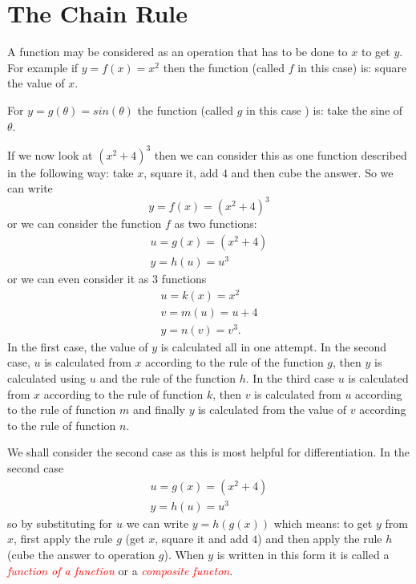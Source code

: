 \documentclass[
  11pt,
  oneside]{book}
\newcommand{\slide}{}
\theoremstyle{definition}
\theoremstyle{definition}
\theoremstyle{definition}
\theoremstyle{definition}
\theoremstyle{remark}
\begin{document}
\slide

\section{The Chain Rule}\label{lecture-five}

A function may be considered as an operation that has to be done to \(x\) to get \(y\). For example if \(y = f(x) = x^2\) then the function (called \(f\) in this case) is: square the value of \(x\).

For \(y = g(\theta) = sin(\theta)\) the function (called \(g\) in this case ) is: take the sine of \(\theta\).

If we now look at \((x^2 + 4)^3\) then we can consider this as one function described in the following way: take \(x\), square it, add \(4\) and then cube the answer. So we can write
\[
y = f(x) = (x^2+ 4)^3
\]
or we can consider the function \(f\) as two functions:
\begin{gather*}
u = g(x) = (x^2 + 4)\\
y = h(u) = u^3
\end{gather*}
or we can even consider it as 3 functions
\begin{gather*}
u = k(x) = x^2\\
v = m(u) = u + 4\\
y = n(v) = v^3.
\end{gather*}
In the first case, the value of \(y\) is calculated all in one attempt. In the second case, \(u\) is calculated from \(x\) according to the rule of the function \(g\), then \(y\) is calculated using \(u\) and the rule of the function \(h\). In the third case \(u\) is calculated from \(x\) according to the rule of function \(k\), then \(v\) is calculated from \(u\) according to the rule of function \(m\) and finally \(y\) is calculated from the value of \(v\) according to the rule of function \(n\).

We shall consider the second case as this is most helpful for differentiation. In the second case
\begin{gather*}
u = g(x) = (x^2+ 4)\\
y = h(u) = u^3
\end{gather*}
so by substituting for \(u\) we can write \(y = h(g(x))\) which means: to get \(y\) from \(x\), first apply the rule \(g\) (get \(x\), square it and add \(4\)) and then apply the rule \(h\) (cube the answer to operation \(g\)). When \(y\) is written in this form it is called a \textcolor{red}{\em function of a function} or a \textcolor{red}{\em composite functon}.
\slide
\end{document}
